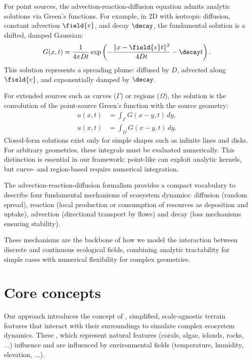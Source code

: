 For point sources, the advection-reaction-diffusion equation admits analytic solutions via Green's functions. For example, in 2D with isotropic diffusion, constant advection $\field{v}$, and decay $\decay$, the fundamental solution is a shifted, damped Gaussian:
\begin{align}
    G(x,t) = \frac{1}{4\pi D t} \exp \left( -\frac{\|x - \field{v}t\|^2}{4Dt} - \decay t \right).
\end{align}
This solution represents a spreading plume: diffused by $D$, advected along $\field{v}$, and exponentially damped by $\decay$.  

For extended sources such as curves ($\Gamma$) or regions ($\Omega$), the solution is the convolution of the point-source Green's function with the source geometry:
\begin{align}
    u(x,t) &= \int_\Gamma G(x-y,t)\,dy, \\
    u(x,t) &= \int_\Omega G(x-y,t)\,dy.
\end{align}
Closed-form solutions exist only for simple shapes such as infinite lines and disks. For arbitrary geometries, these integrals must be evaluated numerically.  
This distinction is essential in our framework: point-like  can exploit analytic kernels, but curve- and region-based  require numerical integration.

\midConclusion 
The advection-reaction-diffusion formalism provides a compact vocabulary to describe four fundamental mechanisms of ecosystem dynamics: diffusion (random spread), reaction (local production or consumption of resources as  deposition and uptake), advection (directional transport by flows) and decay (loss mechanisms ensuring stability).

These mechanisms are the backbone of how we model the interaction between discrete  and continuous ecological fields, combining analytic tractability for simple cases with numerical flexibility for complex geometries.









\section{Core concepts}
\label{sec:env-obj-pipeline}

Our approach introduces the concept of , simplified, scale-agnostic terrain features that interact with their surroundings to simulate complex ecosystem dynamics. These , which represent natural features (corals, algae, islands, rocks, ...) influence and are influenced by environmental fields (temperature, humidity, elevation, ...). 

